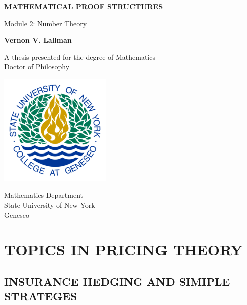 \documentclass{book}
\theoremstyle{definition}
\theoremstyle{remark}
\begin{document}
\begin{titlepage}
    \begin{center}
        \vspace*{1cm}
        
        \textbf{MATHEMATICAL PROOF STRUCTURES}
        
        \vspace{0.5cm}
        Module 2: Number Theory
        
        \vspace{1.5cm}
        
        \textbf{Vernon V. Lallman}
        
        \vfill
        
        A thesis presented for the degree of Mathematics\\
        Doctor of Philosophy
        
        \vspace{0.8cm}
        
        \includegraphics[width=0.4\textwidth]{university}
        
        Mathematics Department\\
        State University of New York \\
        Geneseo\\
        \date{\today}
        
    \end{center}
\end{titlepage}

\tableofcontents

\newpage
\chapter{TOPICS IN PRICING THEORY}
\newpage

\section{INSURANCE HEDGING AND SIMIPLE STRATEGES}
\end{document}
